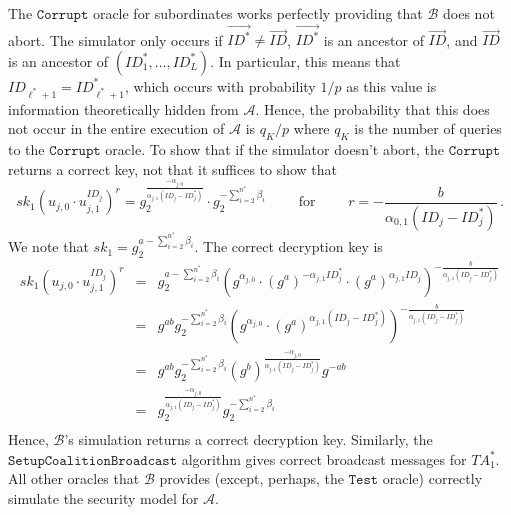 \documentclass[10pt]{llncs}
\newcommand{\A}{\mathcal{A}}
\newcommand{\B}{\mathcal{B}}
\newcommand{\ID}{\mathit{ID}}
\newcommand{\TA}{\mathit{TA}}
\newcommand{\sk}{\mathit{sk}}
\begin{document}
The $\texttt{Corrupt}$ oracle for subordinates works perfectly providing that $\B$ does not abort. The simulator only occurs if $\vec{\ID^{*}}\neq \vec{\ID}$, $\vec{\ID^{*}}$ is an ancestor of $\vec{\ID}$, and $\vec{\ID}$ is an ancestor of $(\ID^{*}_{1},\ldots,\ID^{*}_{L})$. In particular, this means that $\ID_{\ell^{*}+1} = \ID^{*}_{\ell^{*}+1}$, which occurs with probability $1/p$ as this value is information theoretically hidden from $\A$. Hence, the probability that this does not occur in the entire execution of $\A$ is $q_{K}/p$ where $q_{K}$ is the number of queries to the $\texttt{Corrupt}$ oracle. To show that if the simulator doesn't abort, the $\texttt{Corrupt}$ returns a correct key, not that it suffices to show that 
\begin{displaymath}
\sk_1 \left(u_{j,0}\cdot u_{j,1}^{\ID_{j}}\right)^{r} = g_{2}^{\frac{-\alpha_{j,0}}{\alpha_{j,1}(\ID_{j}-\ID^{*}_{j})}} \cdot g_{2}^{-\sum_{i=2}^{n^{*}} \beta_{i}} \qquad \mbox{ for } \qquad r = -\frac{b}{\alpha_{0,1}(\ID_{j}-\ID^{*}_{j})}\, .
\end{displaymath}
We note that $\sk_1 = g_{2}^{a-\sum_{i=2}^{n^{*}} \beta_{i}}$. The correct decryption key is
\begin{eqnarray*}
\sk_1 \left(u_{j,0}\cdot u_{j,1}^{\ID_{j}}\right)^{r} &=& g_{2}^{a-\sum_{i=2}^{n^{*}} \beta_{i}} \left( g^{\alpha_{j,0}} \cdot (g^{a})^{-\alpha_{j,1}\ID^{*}_{j}} \cdot (g^{a})^{\alpha_{j,1}\ID_{j}} \right)^{-\frac{b}{\alpha_{j,1}(\ID_{j}-\ID^{*}_{j})}}\\
&=& g^{ab} g_{2}^{-\sum_{i=2}^{n^{*}}\beta_{i}} \left( g^{\alpha_{j,0}} \cdot (g^{a})^{\alpha_{j,1}(\ID_{j}-\ID^{*}_{j})} \right)^{-\frac{b}{\alpha_{j,1}(\ID_{j}-\ID^{*}_{j})}} 
\\
&=& g^{ab} g_{2}^{-\sum_{i=2}^{n^{*}}\beta_{i}} (g^{b})^{\frac{-\alpha_{j,0}}{\alpha_{j,1}(\ID_{j}-\ID^{*}_{j})}}g^{-ab}\\
&=& g_{2}^{\frac{-\alpha_{j,0}}{\alpha_{j,1}(\ID_{j}-\ID^{*}_{j})}} g_{2}^{-\sum_{i=2}^{n^{*}}\beta_{i}}\\
\end{eqnarray*}
Hence, $\B$'s simulation returns a correct decryption key. Similarly, the $\texttt{SetupCoalitionBroadcast}$ algorithm gives correct broadcast messages for $\TA^{*}_{1}$. All other oracles that $\B$ provides (except, perhaps, the $\texttt{Test}$ oracle) correctly simulate the security model for $\A$.
\end{document}
